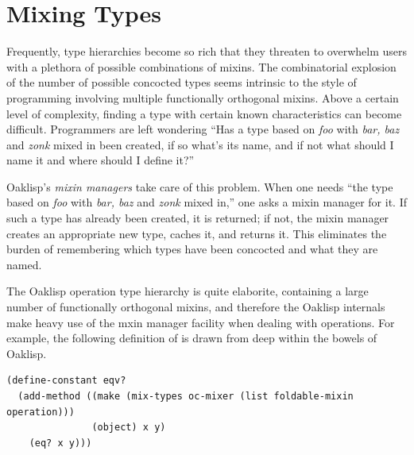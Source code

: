 

\section{Mixing Types}

Frequently, type hierarchies become so rich that they threaten to
overwhelm users with a plethora of possible combinations of mixins.
The combinatorial explosion of the number of possible concocted types
seems intrinsic to the style of programming involving multiple
functionally orthogonal mixins.  Above a certain level of complexity,
finding a type with certain known characteristics can become
difficult.  Programmers are left wondering ``Has a type based on
\emph{foo} with \emph{bar, baz} and \emph{zonk} mixed in been created, if so
what's its name, and if not what should I name it and where should I
define it?''

Oaklisp's \emph{mixin managers} take care of this problem.  When one
needs ``the type based on \emph{foo} with \emph{bar, baz} and \emph{zonk}
mixed in,'' one asks a mixin manager for it.  If such a type has
already been created, it is returned; if not, the mixin manager
creates an appropriate new type, caches it, and returns it.  This
eliminates the burden of remembering which types have been concocted
and what they are named.



The Oaklisp operation type hierarchy is quite elaborite, containing a
large number of functionally orthogonal mixins, and therefore the
Oaklisp internals make heavy use of the mxin manager facility when
dealing with operations.  For example, the following definition of
 is drawn from deep within the bowels of Oaklisp.
\begin{verbatim}
(define-constant eqv?
  (add-method ((make (mix-types oc-mixer (list foldable-mixin operation)))
               (object) x y)
    (eq? x y)))
\end{verbatim}
